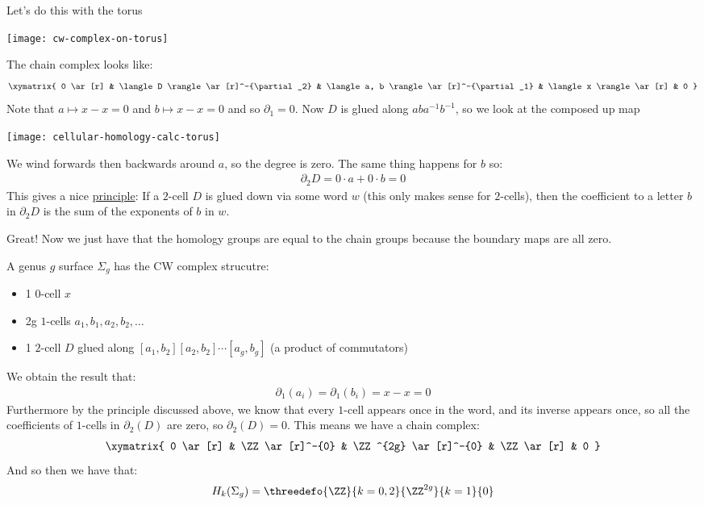 \begin{example}
	Let's do this with the torus
	\begin{center}
		\texttt{[image: cw-complex-on-torus]}
	\end{center}
	The chain complex looks like:
	\begin{align*}
		\xymatrix{
		0 \ar[r] & \langle D \rangle \ar[r]^-{\partial_2} & \langle a, b \rangle \ar[r]^-{\partial_1} & \langle x \rangle \ar[r] & 0
		}
	\end{align*}
	Note that $a \mapsto x - x = 0$ and $b \mapsto x - x = 0$ and so $\partial_1 = 0$. Now $D$ is glued along $aba^{-1}b^{-1}$, so we look at the composed up map
	\begin{center}
		\texttt{[image: cellular-homology-calc-torus]}
	\end{center}
	We wind forwards then backwards around $a$, so the degree is zero. The same thing happens for $b$ so:
	\begin{align*}
		\partial_2 D = 0 \cdot a + 0 \cdot b = 0
	\end{align*}
	This gives a nice \ul{principle}: If a $2$-cell $D$ is glued down via some word $w$ (this only makes sense for $2$-cells), then the coefficient to a letter $b$ in $\partial_2 D$ is the sum of the exponents of $b$ in $w$.

	Great! Now we just have that the homology groups are equal to the chain groups because the boundary maps are all zero.
\end{example}

\begin{example}
	A genus $g$ surface $\Sigma_g$ has the CW complex strucutre:
	\begin{itemize}
		\item 1 $0$-cell $x$
		\item 2g $1$-cells $a_1, b_1, a_2, b_2, \ldots$
		\item 1 $2$-cell $D$ glued along $[a_1, b_2][a_2, b_2]\cdots[a_g, b_g]$ (a product of commutators)
	\end{itemize}
	We obtain the result that:
	\begin{align*}
		\partial_1(a_i) = \partial_1(b_i) = x - x = 0
	\end{align*}
	Furthermore by the principle discussed above, we know that every $1$-cell appears once in the word, and its inverse appears once, so all the coefficients of $1$-cells in $\partial_2(D)$ are zero, so $\partial_2(D) = 0$. This means we have a chain complex:
	\begin{align*}
		\xymatrix{
		0 \ar[r] & \ZZ \ar[r]^-{0} & \ZZ^{2g} \ar[r]^-{0} & \ZZ \ar[r] & 0
		}
	\end{align*}
	And so then we have that:
	\begin{align*}
		H_k(\Sigma_g) = \threedefo{\ZZ}{k = 0, 2}{\ZZ^{2g}}{k = 1}{0}
	\end{align*}
\end{example}

